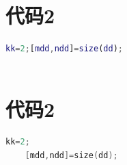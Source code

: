 \documentclass[withoutpreface,bwprint]{cumcmthesis} %
\begin{document}
\newpage
\begin{appendices}
	\section{代码2}
	 
	\begin{lstlisting}[language=matlab]
	kk=2;[mdd,ndd]=size(dd);
	 
	 \end{lstlisting}
	 
	 \section{代码2}
	 
	\begin{lstlisting}[language=c]
	kk=2;
	[mdd,ndd]=size(dd);
	 \end{lstlisting}
	\end{appendices}
\end{document}

